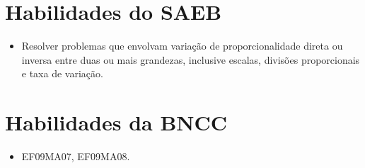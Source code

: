 \section*{Habilidades do SAEB}

\begin{itemize}
  \item Resolver problemas que envolvam variação de proporcionalidade direta
ou inversa entre duas ou mais grandezas, inclusive escalas, divisões
proporcionais e taxa de variação.   
\end{itemize} 

\section*{Habilidades da BNCC}

\begin{itemize}
  \item EF09MA07, EF09MA08.
\end{itemize}

